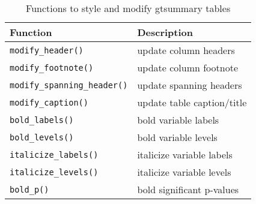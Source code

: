 \captionsetup[table]{labelformat=empty,skip=1pt}
\begin{longtable}{ll}
\caption{\label{tab:} Functions to style and modify gtsummary tables}\\
\toprule
Function & Description \\ 
\midrule
\texttt{modify\_header()} & update column headers \\ 
\texttt{modify\_footnote()} & update column footnote \\ 
\texttt{modify\_spanning\_header()} & update spanning headers \\ 
\texttt{modify\_caption()} & update table caption/title \\ 
\texttt{bold\_labels()} & bold variable labels \\ 
\texttt{bold\_levels()} & bold variable levels \\ 
\texttt{italicize\_labels()} & italicize variable labels \\ 
\texttt{italicize\_levels()} & italicize variable levels \\ 
\texttt{bold\_p()} & bold significant p-values \\ 
\bottomrule
\end{longtable}

